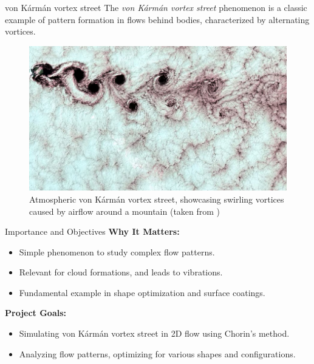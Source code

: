 \begin{frame}{von Kármán vortex street}
    The \textit{von Kármán vortex street} phenomenon is a classic example of pattern formation in flows behind bodies, characterized by alternating vortices. 

    \begin{figure}
        \centering
        \includegraphics[width=0.6\linewidth]{graphics/example_atmos.png}
        \caption{Atmospheric von Kármán vortex street, showcasing swirling vortices caused by airflow around a mountain (taken from \autocite{wiki})}
        \label{fig:example_vortices}
    \end{figure}
\end{frame}

\begin{frame}{Importance and Objectives}
    \textbf{Why It Matters:}
    \begin{itemize}
        \item Simple phenomenon to study complex flow patterns.
        \item Relevant for cloud formations, and leads to vibrations.
        \item Fundamental example in shape optimization and surface coatings.
    \end{itemize}
    
    \textbf{Project Goals:}
    \begin{itemize}
        \item Simulating von Kármán vortex street in 2D flow using Chorin's method.
        \item Analyzing flow patterns, optimizing for various shapes and configurations.
    \end{itemize}
\end{frame}


